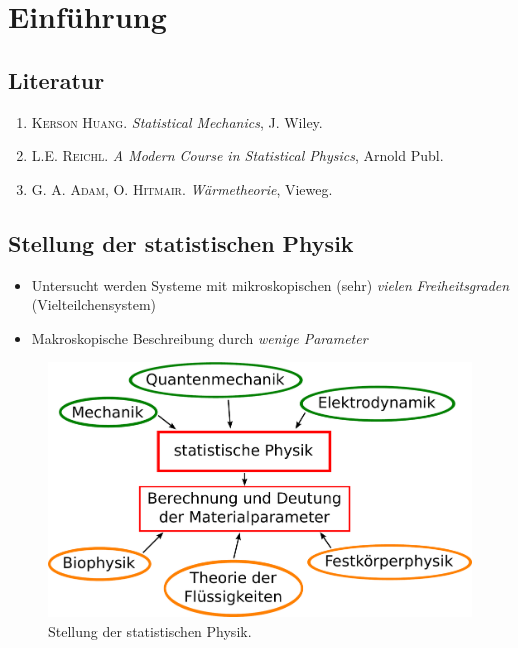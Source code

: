 \section{Einführung}
\subsection{Literatur}
\begin{enumerate}
    \item \textsc{Kerson Huang}. \emph{Statistical Mechanics}, J. Wiley.
    \item \textsc{L.E. Reichl}. \emph{A Modern Course in Statistical Physics}, Arnold Publ.
    \item \textsc{G. A. Adam, O. Hitmair}. \emph{Wärmetheorie}, Vieweg.
\end{enumerate}

\subsection{Stellung der statistischen Physik}
\begin{itemize}
    \item Untersucht werden Systeme mit mikroskopischen (sehr) \emph{vielen} \emph{Freiheitsgraden} \\
    (Vielteilchensystem)
    \item Makroskopische Beschreibung durch \emph{wenige Parameter}
\end{itemize}
\begin{figure}[H]
    \begin{center}
        \includegraphics[width=\textwidth]{../img/dependencies.pdf}
        \caption{Stellung der statistischen Physik.}
        \label{img:position_statphys}
    \end{center}
\end{figure}